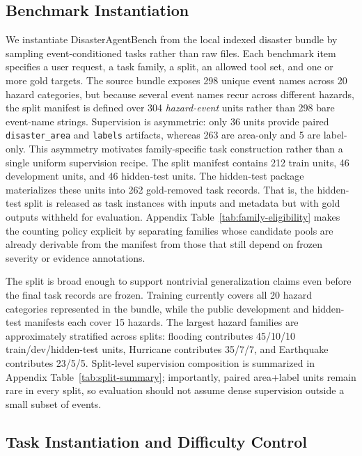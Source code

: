 \documentclass{article}
\newcommand{\datasetevents}{298}
\newcommand{\datasethazards}{20}
\begin{document}
\subsection{Benchmark Instantiation}

We instantiate DisasterAgentBench from the local indexed disaster bundle by sampling event-conditioned tasks rather than raw files. Each benchmark item specifies a user request, a task family, a split, an allowed tool set, and one or more gold targets. The source bundle exposes \datasetevents{} unique event names across \datasethazards{} hazard categories, but because several event names recur across different hazards, the split manifest is defined over 304 \emph{hazard-event} units rather than 298 bare event-name strings. Supervision is asymmetric: only 36 units provide paired \texttt{disaster\_area} and \texttt{labels} artifacts, whereas 263 are area-only and 5 are label-only. This asymmetry motivates family-specific task construction rather than a single uniform supervision recipe. The split manifest contains 212 train units, 46 development units, and 46 hidden-test units. The hidden-test package materializes these units into 262 gold-removed task records. That is, the hidden-test split is released as task instances with inputs and metadata but with gold outputs withheld for evaluation. Appendix Table~\ref{tab:family-eligibility} makes the counting policy explicit by separating families whose candidate pools are already derivable from the manifest from those that still depend on frozen severity or evidence annotations.

The split is broad enough to support nontrivial generalization claims even before the final task records are frozen. Training currently covers all 20 hazard categories represented in the bundle, while the public development and hidden-test manifests each cover 15 hazards. The largest hazard families are approximately stratified across splits: flooding contributes 45/10/10 train/dev/hidden-test units, Hurricane contributes 35/7/7, and Earthquake contributes 23/5/5. Split-level supervision composition is summarized in Appendix Table~\ref{tab:split-summary}; importantly, paired area+label units remain rare in every split, so evaluation should not assume dense supervision outside a small subset of events.

\subsection{Task Instantiation and Difficulty Control}
\end{document}
